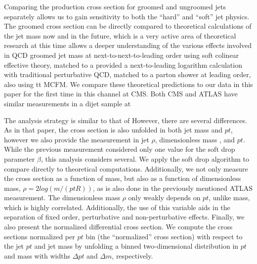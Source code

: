 Comparing the production cross section for groomed and ungroomed jets separately allows us to
gain sensitivity to both the ``hard'' and ``soft'' jet physics. 
The groomed cross section can be directly compared to theoretical calculations of the jet mass
now and in the future, which is a very active area of theoretical research
at this time
allows a deeper understanding of the various effects involved in QCD
groomed jet mass at next-to-next-to-leading order using soft colinear effective theory, matched to a
provided a next-to-leading logarithm calculation with traditional perturbative QCD, matched to a 
parton shower at leading order, also using {tt MCFM}.  We compare these theoretical predictions 
to our data in this paper for the first time in this channel at CMS. Both CMS and ATLAS have similar measurements in a dijet sample at %

The analysis strategy is similar to that of %
However, there are several differences. As in that paper, the cross section is also
unfolded in both jet mass and $pt$, however we also provide the measurement in jet $\rho$, dimensionless mass , and $pt$. While the previous measurement considered only one value for the soft drop parameter $\beta$, this analysis considers several.
We apply the soft drop algorithm to compare
directly to theoretical computations. Additionally, we not only measure the cross section as a function of mass, but also as a function of dimensionless mass, $\rho = 2log(m/(pt R))$, as is also done in the previously mentioned ATLAS measurement.  The dimensionless mass $\rho$ only weakly depends on $pt$, unlike mass, which is highly correlated. Additionally, the use of this variable aids in the separation of fixed order, perturbative and non-perturbative effects.
Finally, we also present the normalized differential cross section. We compute the cross sections normalized per $pt$ bin
(the ``normalized'' cross section) with respect to the jet $pt$ and jet mass 
by unfolding a binned two-dimensional distribution in $pt$ and mass
with widths $\Delta pt$ and $\Delta m$, respectively.

